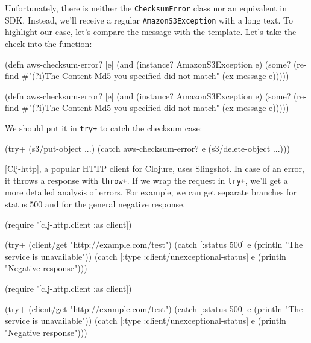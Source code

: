 Unfortunately, there is neither the \verb|ChecksumError| class nor an equivalent in SDK. Instead, we'll receive a regular \verb|AmazonS3Exception| with a long text. To highlight our case, let's compare the message with the template. Let's take the check into the function:

\ifx\DEVICETYPE\MOBILE

\begin{clojure}
(defn aws-checksum-error? [e]
  (and
    (instance? AmazonS3Exception e)
    (some?
      (re-find
        #"(?i)The Content-Md5
            you specified did not match"
        (ex-message e)))))
\end{clojure}

\else

\begin{clojure}
(defn aws-checksum-error? [e]
  (and (instance? AmazonS3Exception e)
       (some?
        (re-find
         #"(?i)The Content-Md5 you specified did not match"
         (ex-message e)))))
\end{clojure}

\fi

\noindent
We should put it in \verb|try+| to catch the checksum case:

\begin{clojure}
(try+
  (s3/put-object ...)
  (catch aws-checksum-error? e
    (s3/delete-object ...)))
\end{clojure}

[Clj-http], a popular HTTP client for Clojure, uses Slingshot. In case of an error, it throws a response with \verb|throw+|. If we wrap the request in \verb|try+|, we'll get a more detailed analysis of errors. For example, we can get separate branches for status 500 and for the general negative response.

\ifx\DEVICETYPE\MOBILE

\begin{clojure}
(require '[clj-http.client :as client])

(try+
 (client/get "http://example.com/test")
 (catch [:status 500] e
  (println "The service is unavailable"))
 (catch
  [:type :client/unexceptional-status] e
  (println "Negative response")))
\end{clojure}

\else

\begin{clojure}
(require '[clj-http.client :as client])

(try+
 (client/get "http://example.com/test")
 (catch [:status 500] e
   (println "The service is unavailable"))
 (catch [:type :client/unexceptional-status] e
   (println "Negative response")))
\end{clojure}

